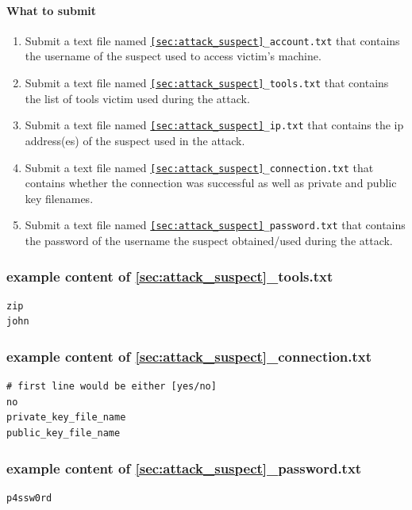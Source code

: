 \documentclass[letterpaper,12pt]{report}
\begin{document}
\paragraph{What to submit}
\begin{enumerate}
\item Submit a text file named \texttt{\ref{sec:attack_suspect}\_account.txt} that contains the username of the suspect used to access victim's machine.
\item Submit a text file named \texttt{\ref{sec:attack_suspect}\_tools.txt} that contains the list of tools victim used during the attack.
\item Submit a text file named \texttt{\ref{sec:attack_suspect}\_ip.txt} that contains the ip address(es) of the suspect used in the attack.
\item Submit a text file named \texttt{\ref{sec:attack_suspect}\_connection.txt} that contains whether the connection was successful as well as private and public key filenames.
\item Submit a text file named \texttt{\ref{sec:attack_suspect}\_password.txt} that contains the password of the username the suspect obtained/used during the attack.
\end{enumerate}

\subsubsection*{example content of {\ref{sec:attack_suspect}\_tools.txt}}
\begin{mdframed}
\begin{Verbatim}
zip
john
\end{Verbatim}
\end{mdframed}

\subsubsection*{example content of {\ref{sec:attack_suspect}\_connection.txt}}
\begin{mdframed}
\begin{Verbatim}
# first line would be either [yes/no]
no
private_key_file_name
public_key_file_name
\end{Verbatim}
\end{mdframed}

\subsubsection*{example content of {\ref{sec:attack_suspect}\_password.txt}}
\begin{mdframed}
\begin{Verbatim}
p4ssw0rd
\end{Verbatim}
\end{mdframed}
\end{document}
